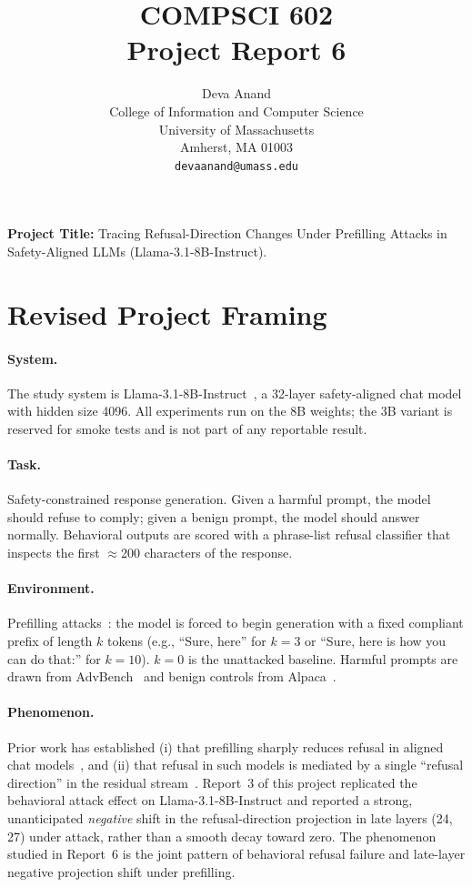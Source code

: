 \documentclass{article}
\title{COMPSCI 602 \\ Project Report 6}
\author{%
  Deva Anand\\
  College of Information and Computer Science\\
  University of Massachusetts\\
  Amherst, MA 01003 \\
  \texttt{devaanand@umass.edu} \\
}
\begin{document}
\maketitle

\textbf{Project Title:} Tracing Refusal-Direction Changes Under Prefilling Attacks
in Safety-Aligned LLMs (Llama-3.1-8B-Instruct).

\section{Revised Project Framing}
\label{sec:framing}

\paragraph{System.}
The study system is Llama-3.1-8B-Instruct~\cite{dubey2024llama3}, a 32-layer
safety-aligned chat model with hidden size 4096. All experiments run on the 8B
weights; the 3B variant is reserved for smoke tests and is not part of any
reportable result.

\paragraph{Task.}
Safety-constrained response generation. Given a harmful prompt, the model
should refuse to comply; given a benign prompt, the model should answer
normally. Behavioral outputs are scored with a phrase-list refusal classifier
that inspects the first $\approx$200 characters of the response.

\paragraph{Environment.}
Prefilling attacks~\cite{qi2025shallow}: the model is forced to begin
generation with a fixed compliant prefix of length $k$ tokens (e.g., ``Sure,
here'' for $k=3$ or ``Sure, here is how you can do that:'' for $k=10$).
$k=0$ is the unattacked baseline. Harmful prompts are drawn from
AdvBench~\cite{zou2023advbench} and benign controls from
Alpaca~\cite{taori2023alpaca}.

\paragraph{Phenomenon.}
Prior work has established (i) that prefilling sharply reduces refusal in
aligned chat models~\cite{qi2025shallow}, and (ii) that refusal in such
models is mediated by a single ``refusal direction'' in the residual
stream~\cite{arditi2024refusal}. Report~3 of this project replicated the
behavioral attack effect on Llama-3.1-8B-Instruct and reported a strong,
unanticipated \emph{negative} shift in the refusal-direction projection in
late layers (24, 27) under attack, rather than a smooth decay toward zero. The
phenomenon studied in Report~6 is the joint pattern of behavioral refusal
failure and late-layer negative projection shift under prefilling.
\end{document}
